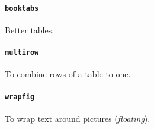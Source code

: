\paragraph{\texttt{booktabs}} %
\label{par:booktabs}
Better tables.
\paragraph{\texttt{multirow}} %
\label{par:multirow}
To combine rows of a table to one.
\paragraph{\texttt{wrapfig}} %
\label{par:wrapfig}
To wrap text around pictures (\emph{floating}).

